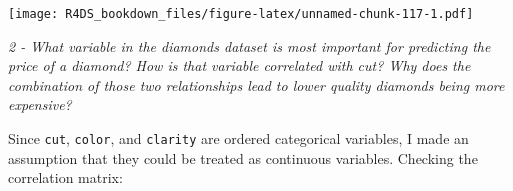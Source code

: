 \documentclass[]{article}
\newenvironment{Shaded}{\begin{snugshade}}{\end{snugshade}}
\newcommand{\KeywordTok}[1]{\textcolor[rgb]{0.13,0.29,0.53}{\textbf{#1}}}
\newcommand{\DataTypeTok}[1]{\textcolor[rgb]{0.13,0.29,0.53}{#1}}
\newcommand{\DecValTok}[1]{\textcolor[rgb]{0.00,0.00,0.81}{#1}}
\newcommand{\StringTok}[1]{\textcolor[rgb]{0.31,0.60,0.02}{#1}}
\newcommand{\OperatorTok}[1]{\textcolor[rgb]{0.81,0.36,0.00}{\textbf{#1}}}
\newcommand{\NormalTok}[1]{#1}
\theoremstyle{definition}
\theoremstyle{definition}
\theoremstyle{definition}
\theoremstyle{remark}
\begin{document}
\begin{Shaded}
\end{Shaded}

\texttt{[image: R4DS\_bookdown\_files/figure-latex/unnamed-chunk-117-1.pdf]}

\emph{2 - What variable in the diamonds dataset is most important for
predicting the price of a diamond? How is that variable correlated with
cut? Why does the combination of those two relationships lead to lower
quality diamonds being more expensive?}

Since \texttt{cut}, \texttt{color}, and \texttt{clarity} are ordered
categorical variables, I made an assumption that they could be treated
as continuous variables. Checking the correlation matrix:

\begin{Shaded}
\end{Shaded}
\end{document}
